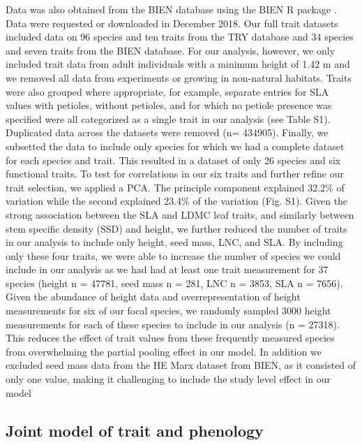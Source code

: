 \documentclass{article}\usepackage[]{graphicx}\usepackage[]{color}
\begin{document}
Data was also obtained from the BIEN database using the BIEN R package \citep{Maitner2017}. Data were requested or downloaded in December 2018. Our full trait datasets included data on 96 species and ten traits from the TRY database and 34 species and seven traits from the BIEN database. For our analysis, however, we only included trait data from adult individuals with a minimum height of 1.42 m and we removed all data from experiments or growing in non-natural habitats. Traits were also grouped where appropriate, for example, separate entries for SLA values with petioles, without petioles, and for which no petiole presence was specified were all categorized as a single trait in our analysis (see Table S1). Duplicated data across the datasets were removed (n= 434905). Finally, we subsetted the data to include only species for which we had a complete dataset for each species and trait. This resulted in a dataset of only 26 species and six functional traits. To test for correlations in our six traits and further refine our trait selection, we applied a PCA. The principle component explained 32.2\% of variation while the second explained 23.4\% of the variation (Fig. S1). Given the strong association between the SLA and LDMC leaf traits, and similarly between stem specific density (SSD) and height, we further reduced the number of traits in our analysis to include only height, seed mass, LNC, and SLA. By including only these four traits, we were able to increase the number of species we could include in our analysis as we had had at least one trait measurement for 37 species (height n = 47781, seed mass n = 281, LNC n = 3853, SLA n = 7656). Given the abundance of height data and overrepresentation of height measurements for six of our focal species, we randomly sampled 3000 height measurements for each of these species to include in our analysis (n = 27318). This reduces the effect of trait values from these frequently measured species from overwhelming the partial pooling effect in our model. In addition we excluded seed mass data from the HE Marx dataset from BIEN, as it consisted of only one value, making it challenging to include the study level effect in our model\\ 

\subsection*{Joint model of trait and phenology}
\end{document}
